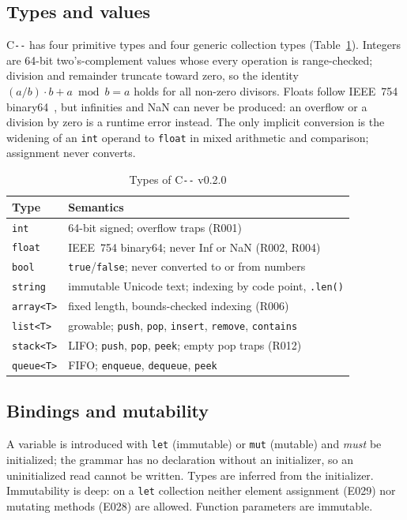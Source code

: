\documentclass[conference]{IEEEtran}
\newcommand{\cmm}{C\texttt{-{}-}}
\begin{document}
\subsection{Types and values}
\cmm{} has four primitive types and four generic collection types (Table~\ref{tab:types}). Integers are 64-bit
two's-complement values whose every operation is range-checked; division and remainder truncate toward zero,
so the identity $(a/b)\cdot b + a \bmod b = a$ holds for all non-zero divisors. Floats follow IEEE~754
binary64~\cite{ieee754}, but infinities and NaN can never be produced: an overflow or a division by zero is a
runtime error instead. The only implicit conversion is the widening of an \texttt{int} operand to
\texttt{float} in mixed arithmetic and comparison; assignment never converts.

\begin{table}[t]
\caption{Types of \cmm{} v0.2.0}
\label{tab:types}
\centering
\footnotesize
\begin{tabular}{@{}l p{5.3cm}@{}}
\toprule
\textbf{Type} & \textbf{Semantics} \\
\midrule
\texttt{int}    & 64-bit signed; overflow traps (R001) \\
\texttt{float}  & IEEE~754 binary64; never Inf or NaN (R002, R004) \\
\texttt{bool}   & \texttt{true}/\texttt{false}; never converted to or from numbers \\
\texttt{string} & immutable Unicode text; indexing by code point, \texttt{.len()} \\
\midrule
\texttt{array<T>} & fixed length, bounds-checked indexing (R006) \\
\texttt{list<T>}  & growable; \texttt{push}, \texttt{pop}, \texttt{insert}, \texttt{remove}, \texttt{contains} \\
\texttt{stack<T>} & LIFO; \texttt{push}, \texttt{pop}, \texttt{peek}; empty pop traps (R012) \\
\texttt{queue<T>} & FIFO; \texttt{enqueue}, \texttt{dequeue}, \texttt{peek} \\
\bottomrule
\end{tabular}
\end{table}

\subsection{Bindings and mutability}
A variable is introduced with \texttt{let} (immutable) or \texttt{mut} (mutable) and \emph{must} be
initialized; the grammar has no declaration without an initializer, so an uninitialized read cannot be
written. Types are inferred from the initializer. Immutability is deep: on a \texttt{let} collection neither
element assignment (E029) nor mutating methods (E028) are allowed. Function parameters are immutable.
\end{document}
